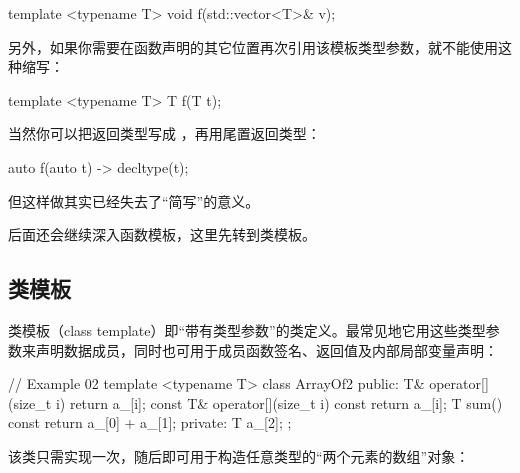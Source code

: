 \begin{code}
template <typename T> void f(std::vector<T>& v);
\end{code}

另外，如果你需要在函数声明的其它位置再次引用该模板类型参数，就不能使用这种缩写：

\begin{code}
template <typename T> T f(T t);
\end{code}

当然你可以把返回类型写成 ，再用尾置返回类型：

\begin{code}
auto f(auto t) -> decltype(t);
\end{code}

但这样做其实已经失去了“简写”的意义。

后面还会继续深入函数模板，这里先转到类模板。

\subsection{类模板}

类模板（class template）即“带有类型参数”的类定义。最常见地它用这些类型参数来声明数据成员，同时也可用于成员函数签名、返回值及内部局部变量声明：

\begin{code}
// Example 02
template <typename T> class ArrayOf2 {
  public:
  T& operator[](size_t i) { return a_[i]; }
  const T& operator[](size_t i) const { return a_[i]; }
  T sum() const { return a_[0] + a_[1]; }
  private:
  T a_[2];
};
\end{code}

该类只需实现一次，随后即可用于构造任意类型的“两个元素的数组”对象：

